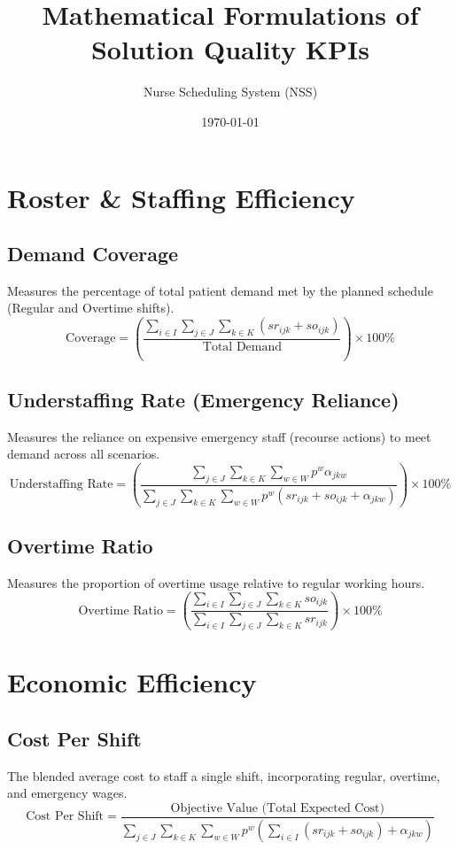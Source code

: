 \documentclass{article}
\title{Mathematical Formulations of Solution Quality KPIs}
\author{Nurse Scheduling System (NSS)}
\date{\today}
\begin{document}
\maketitle

\section{Roster \& Staffing Efficiency}

\subsection{Demand Coverage}
Measures the percentage of total patient demand met by the planned schedule (Regular and Overtime shifts).
\begin{equation}
\text{Coverage} = \left( \frac{\sum_{i \in I} \sum_{j \in J} \sum_{k \in K} (sr_{ijk} + so_{ijk})}{\text{Total Demand}} \right) \times 100\%
\end{equation}

\subsection{Understaffing Rate (Emergency Reliance)}
Measures the reliance on expensive emergency staff (recourse actions) to meet demand across all scenarios.
\begin{equation}
\text{Understaffing Rate} = \left( \frac{\sum_{j \in J} \sum_{k \in K} \sum_{w \in W} p^w \alpha_{jkw}}{\sum_{j \in J} \sum_{k \in K} \sum_{w \in W} p^w (sr_{ijk} + so_{ijk} + \alpha_{jkw})} \right) \times 100\%
\end{equation}

\subsection{Overtime Ratio}
Measures the proportion of overtime usage relative to regular working hours.
\begin{equation}
\text{Overtime Ratio} = \left( \frac{\sum_{i \in I} \sum_{j \in J} \sum_{k \in K} so_{ijk}}{\sum_{i \in I} \sum_{j \in J} \sum_{k \in K} sr_{ijk}} \right) \times 100\%
\end{equation}

\section{Economic Efficiency}

\subsection{Cost Per Shift}
The blended average cost to staff a single shift, incorporating regular, overtime, and emergency wages.
\begin{equation}
\text{Cost Per Shift} = \frac{\text{Objective Value (Total Expected Cost)}}{\sum_{j \in J} \sum_{k \in K} \sum_{w \in W} p^w (\sum_{i \in I}(sr_{ijk} + so_{ijk}) + \alpha_{jkw})}
\end{equation}
\end{document}
